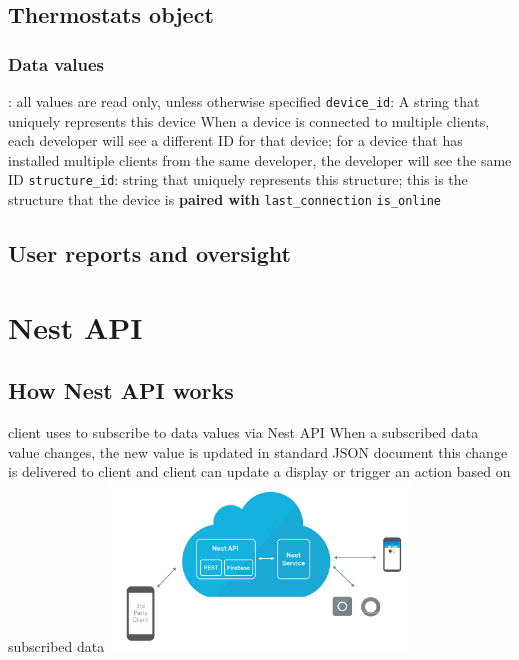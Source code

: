 \documentclass{myproc}
\begin{document}
\subsection{Thermostats object}
\subsubsection{Data values}
\bit
\w {}: all values are read only, unless otherwise specified
   \bit
   \w \textcolor{red2}{\texttt{device\_id}}: 
      \bit
      \w A string that uniquely represents this device
      \w When a device is connected to multiple clients, each developer will see a different ID for that device; for a device that has installed multiple clients from the same developer, the developer will see the same ID
      \eit
   \w \textcolor{red2}{\texttt{structure\_id}}:
      string that uniquely represents this structure; this is \textcolor{blue2}{the structure that the device is {\bf{}paired with}}
   \w \textcolor{red2}{\texttt{last\_connection}}
   \w \textcolor{red2}{\texttt{is\_online}}
   \eit
\eit

\subsection{User reports and oversight}

\section{Nest API}
\subsection{How Nest API works}
\bit
\w client uses  to subscribe to data values
   via Nest API
\w When a subscribed data value changes, the new value is updated in standard
  JSON document
\w this change is delivered to client and client can update a display or
  trigger an action based on subscribed data
\includegraphics[width=8cm]{pics/howitworks}
\eit
\end{document}
